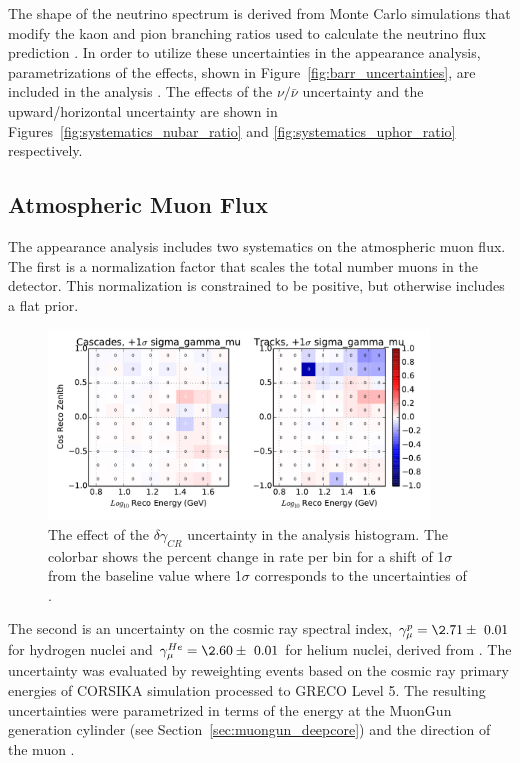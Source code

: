 The shape of the neutrino spectrum is derived from Monte Carlo simulations that modify the kaon and pion branching ratios used to calculate the neutrino flux prediction \cite{NuFlux-Barr,NuFlux-Manchester}.
In order to utilize these uncertainties in the appearance analysis, parametrizations of the effects, shown in Figure~\ref{fig:barr_uncertainties}, are included in the analysis \cite{IceCube-Oscillation2015,IceCube-Oscillation2018}.
The effects of the $\nu/\bar{\nu}$ uncertainty and the upward/horizontal uncertainty are shown in Figures~\ref{fig:systematics_nubar_ratio} and \ref{fig:systematics_uphor_ratio} respectively.


\label{subsec:muon_systematics}
\subsection{Atmospheric Muon Flux}
The appearance analysis includes two systematics on the atmospheric muon flux.
The first is a normalization factor that scales the total number muons in the detector.
This normalization is constrained to be positive, but otherwise includes a flat prior.

\begin{figure}
\centering
\includegraphics[width=0.9\textwidth]{systematics/sigma_gamma_mu_variation.pdf} 
\caption[Effect of $\delta \gamma_{CR}$ in the analysis histogram]{The effect of the  $\delta \gamma_{CR}$ uncertainty in the analysis histogram. The colorbar shows the percent change in rate per bin for a shift of 1$\sigma$ from the baseline value where 1$\sigma$ corresponds to the uncertainties of \cite{Thesis-Ste}. }
\label{fig:systematics_gamma_mu}
\end{figure}

The second is an uncertainty on the cosmic ray spectral index, $\gamma^{p}_\mu=\2.71\pm~0.01$ for hydrogen nuclei and $\gamma^{He}_\mu=\2.60\pm~0.01$ for helium nuclei, derived from \cite{NuFlux-Manchester}.
The uncertainty was evaluated by reweighting events based on the cosmic ray primary energies of CORSIKA simulation processed to GRECO Level 5.
The resulting uncertainties were parametrized in terms of the energy at the MuonGun generation cylinder (see Section~\ref{sec:muongun_deepcore}) and the direction of the muon \cite{Thesis-Ste}.

